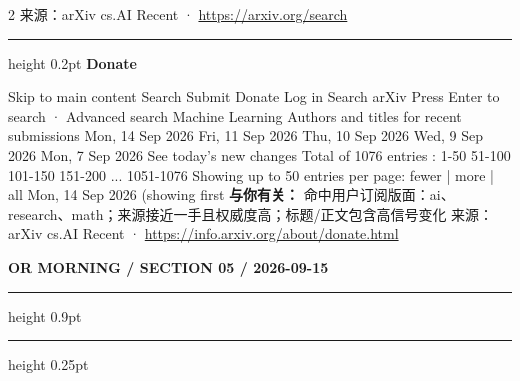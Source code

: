 \documentclass[10.5pt]{ctexart}
\begin{document}
\begin{multicols}{2}
{\footnotesize\color{ormuted} 来源：arXiv cs.AI Recent · \url{https://arxiv.org/search}}
\vspace{2mm}
\hrule height 0.2pt
\vspace{2mm}
{\large\bfseries Donate}\par
Skip to main content Search Submit Donate Log in Search arXiv Press Enter to search · Advanced search Machine Learning Authors and titles for recent submissions Mon, 14 Sep 2026 Fri, 11 Sep 2026 Thu, 10 Sep 2026 Wed, 9 Sep 2026 Mon, 7 Sep 2026 See today's new changes Total of 1076 entries : 1-50 51-100 101-150 151-200 ... 1051-1076 Showing up to 50 entries per page: fewer | more | all Mon, 14 Sep 2026 (showing first 
\textbf{与你有关：} 命中用户订阅版面：ai、research、math；来源接近一手且权威度高；标题/正文包含高信号变化
{\footnotesize\color{ormuted} 来源：arXiv cs.AI Recent · \url{https://info.arxiv.org/about/donate.html}}
\end{multicols}
\newpage
{\small\bfseries OR MORNING / SECTION 05 / 2026-09-15}
\vspace{2mm}
\hrule height 0.9pt
\vspace{1.5mm}
\hrule height 0.25pt
\vspace{4mm}
\end{document}
